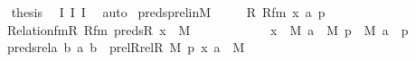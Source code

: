 \begin{isabellebody}
\isanewline
\isanewline
\ \ \isamarkupfalse%
\ {\isacharquery}{\kern0pt}thesis\ \isamarkupfalse%
\ I{}\ I{}\ I{}\ \isamarkupfalse%
\ auto\isanewline
{}\isamarkupfalse%
%
\endisatagproof
{\isafoldproof}%
%
\isadelimproof
\isanewline
%
\endisadelimproof
\isanewline
{}\isamarkupfalse%
\ preds{\isacharunderscore}{\kern0pt}prel{\isacharunderscore}{\kern0pt}in{\isacharunderscore}{\kern0pt}M\ {\isacharcolon}{\kern0pt}\ \isanewline
\ \ \ R\ Rfm\ x\ a\ p\isanewline
\ \ \ {\isachardoublequoteopen}Relation{\isacharunderscore}{\kern0pt}fm{\isacharparenleft}{\kern0pt}R{\isacharcomma}{\kern0pt}\ Rfm{\isacharparenright}{\kern0pt}{\isachardoublequoteclose}\ {\isachardoublequoteopen}preds{\isacharparenleft}{\kern0pt}R{\isacharcomma}{\kern0pt}\ x{\isacharparenright}{\kern0pt}\ {\isasymin}\ M{\isachardoublequoteclose}\ \ \isanewline
\ \ \ \ \ \ \ \ \ \ {\isachardoublequoteopen}x\ {\isasymin}\ M{\isachardoublequoteclose}\ {\isachardoublequoteopen}a\ {\isasymin}\ M{\isachardoublequoteclose}\ {\isachardoublequoteopen}p\ {\isasymin}\ M{\isachardoublequoteclose}\ {\isachardoublequoteopen}a\ {\isasymin}\ p{\isachardoublequoteclose}\ \isanewline
\ \ \ {\isachardoublequoteopen}preds{\isacharunderscore}{\kern0pt}rel{\isacharparenleft}{\kern0pt}{\isasymlambda}a\ b{\isachardot}{\kern0pt}\ {\isacharless}{\kern0pt}a{\isacharcomma}{\kern0pt}\ b{\isachargreater}{\kern0pt}\ {\isasymin}\ prel{\isacharparenleft}{\kern0pt}Rrel{\isacharparenleft}{\kern0pt}R{\isacharcomma}{\kern0pt}\ M{\isacharparenright}{\kern0pt}{\isacharcomma}{\kern0pt}\ p{\isacharparenright}{\kern0pt}{\isacharcomma}{\kern0pt}\ {\isacharless}{\kern0pt}x{\isacharcomma}{\kern0pt}\ a{\isachargreater}{\kern0pt}{\isacharparenright}{\kern0pt}\ {\isasymin}\ M{\isachardoublequoteclose}\isanewline
%
\isadelimproof
%
\endisadelimproof
%
\isatagproof
{}\isamarkupfalse%
\ {\isacharminus}{\kern0pt}\ \isanewline
\ \ \isamarkupfalse%

\end{isabellebody}
